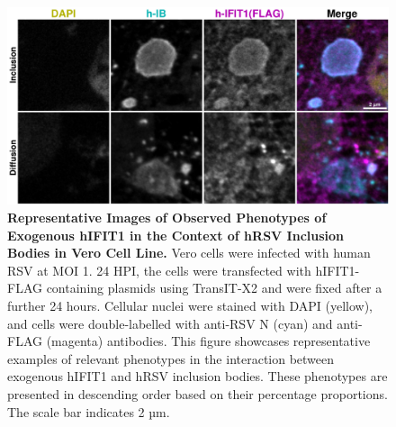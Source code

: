 \begin{figure}
    \centering
    \includegraphics[width=1\linewidth]{09. Chapter 4/Figs/02. Overexpression/01. IFIT1/03. i1-hrsv.pdf}
    \caption[Representative Images of Observed Phenotypes of Exogenous hIFIT1 in the Context of hRSV Inclusion Bodies in Vero Cell Line.]{\textbf{Representative Images of Observed Phenotypes of Exogenous hIFIT1 in the Context of hRSV Inclusion Bodies in Vero Cell Line.} Vero cells were infected with human RSV at MOI 1. 24 HPI, the cells were transfected with hIFIT1-FLAG containing plasmids using TransIT-X2 and were fixed after a further 24 hours. Cellular nuclei were stained with DAPI (yellow), and cells were double-labelled with anti-RSV N (cyan) and anti-FLAG (magenta) antibodies. This figure showcases representative examples of relevant phenotypes in the interaction between exogenous hIFIT1 and hRSV inclusion bodies. These phenotypes are presented in descending order based on their percentage proportions. The scale bar indicates 2 µm.}
    \label{fig:Representative Images of Observed Phenotypes of Exogenous hIFIT1 in the Context of hRSV Inclusion Bodies in VERO Cell Line}
\end{figure}

